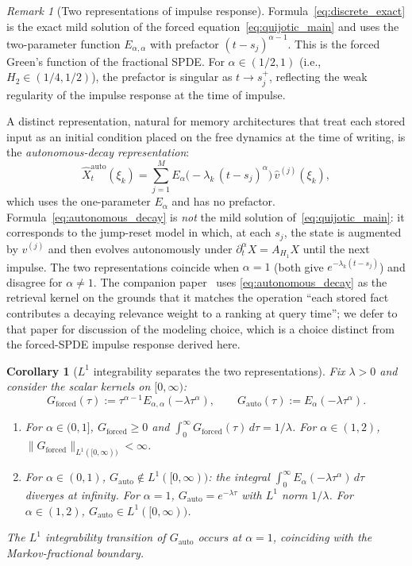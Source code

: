 \documentclass[11pt]{article}
\newtheorem{corollary}[theorem]{Corollary}
\theoremstyle{definition}
\theoremstyle{remark}
\newtheorem{remark}[theorem]{Remark}
\begin{document}
\begin{remark}[Two representations of impulse
response]
\label{rem:two_representations}
Formula~\eqref{eq:discrete_exact} is the exact mild
solution of the forced
equation~\eqref{eq:quijotic_main} and uses the
two-parameter function $E_{\alpha,\alpha}$ with
prefactor $(t-s_j)^{\alpha-1}$.  This is the forced
Green's function of the fractional SPDE.  For
$\alpha \in (1/2, 1)$ (i.e., $H_2 \in (1/4, 1/2)$),
the prefactor is singular as $t \to s_j^+$,
reflecting the weak regularity of the impulse
response at the time of impulse.

A distinct representation, natural for memory
architectures that treat each stored input as an
initial condition placed on the free dynamics at
the time of writing, is the
\emph{autonomous-decay representation}:
\begin{equation}\label{eq:autonomous_decay}
\hat{X}^{\mathrm{auto}}_t(\xi_k)
= \sum_{j=1}^M
E_\alpha\bigl(-\lambda_k\,(t - s_j)^\alpha\bigr)\,
\hat{v}^{(j)}(\xi_k),
\end{equation}
which uses the one-parameter $E_\alpha$ and has no
prefactor.  Formula~\eqref{eq:autonomous_decay} is
\emph{not} the mild solution
of~\eqref{eq:quijotic_main}: it corresponds to the
jump-reset model in which, at each $s_j$, the state
is augmented by $v^{(j)}$ and then evolves
autonomously under
$\partial_t^\alpha X = A_{H_1}X$ until the next
impulse.  The two representations coincide when
$\alpha = 1$ (both give $e^{-\lambda_k(t-s_j)}$) and
disagree for $\alpha \neq 1$.  The companion
paper~\cite{fontes2026arch} uses
\eqref{eq:autonomous_decay} as the retrieval kernel
on the grounds that it matches the operation
``each stored fact contributes a decaying
relevance weight to a ranking at query time'';
we defer to that paper for discussion of the
modeling choice, which is a choice distinct from the
forced-SPDE impulse response derived here.
\end{remark}

\begin{corollary}[$L^1$ integrability separates the
two representations]
\label{cor:l1_separation}
Fix $\lambda > 0$ and consider the scalar kernels on
$[0, \infty)$:
\[
G_{\mathrm{forced}}(\tau) := \tau^{\alpha-1}
E_{\alpha,\alpha}(-\lambda \tau^\alpha),
\qquad
G_{\mathrm{auto}}(\tau) := E_\alpha(-\lambda \tau^\alpha).
\]
\begin{enumerate}[label=\textnormal{(\roman*)}]
\item For $\alpha \in (0, 1]$,
  $G_{\mathrm{forced}} \geq 0$ and
  $\int_0^\infty G_{\mathrm{forced}}(\tau)\,d\tau
  = 1/\lambda$.  For $\alpha \in (1, 2)$,
  $\|G_{\mathrm{forced}}\|_{L^1([0,\infty))}
  < \infty$.
\item For $\alpha \in (0, 1)$,
  $G_{\mathrm{auto}} \notin L^1([0, \infty))$: the
  integral $\int_0^\infty E_\alpha(-\lambda \tau^\alpha)
  \,d\tau$ diverges at infinity.  For $\alpha = 1$,
  $G_{\mathrm{auto}} = e^{-\lambda \tau}$ with
  $L^1$ norm $1/\lambda$.  For $\alpha \in (1, 2)$,
  $G_{\mathrm{auto}} \in L^1([0, \infty))$.
\end{enumerate}
The $L^1$ integrability transition of
$G_{\mathrm{auto}}$ occurs at $\alpha = 1$, coinciding
with the Markov-fractional boundary.
\end{corollary}
\end{document}
